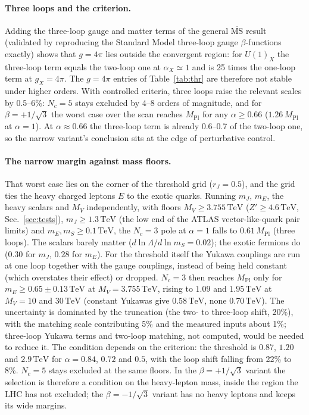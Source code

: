 \documentclass[11pt,a4paper]{article}
\newcommand{\Nc}{N_c}
\newcommand{\MPl}{M_{\mathrm{Pl}}}
\newcommand{\TeV}{\,\mathrm{TeV}}
\begin{document}
\paragraph{Three loops and the criterion.} Adding the three-loop gauge and matter terms of
the general $\overline{\text{MS}}$ result~\cite{Poole:2019kcm} (validated by reproducing
the Standard Model three-loop gauge $\beta$-functions~\cite{Mihaila:2012fm} exactly)
shows that $g=4\pi$ lies outside the convergent region: for $U(1)_X$ the three-loop term
equals the two-loop one at $\alpha_X\simeq1$ and is 25 times the one-loop term at
$g_X=4\pi$. The $g=4\pi$ entries of Table~\ref{tab:thr} are therefore not stable under
higher orders. With controlled criteria, three loops raise the relevant scales by
0.5--6\%: $\Nc=5$ stays excluded by 4--8 orders of magnitude, and for $\beta=+1/\sqrt3$
the worst case over the scan reaches $\MPl$ for any $\alpha\ge0.66$ ($1.26\,\MPl$ at
$\alpha=1$). At $\alpha\approx0.66$ the three-loop term is already 0.6--0.7 of the
two-loop one, so the narrow variant's conclusion sits at the edge of perturbative control.

\paragraph{The narrow margin against mass floors.} That worst case lies on the corner of
the threshold grid ($r_J=0.5$), and the grid ties the heavy charged leptons $E$ to the
exotic quarks. Running $m_J$, $m_E$, the heavy scalars and $M_V$ independently, with
floors $M_V\ge3.755\TeV$ ($Z'\ge4.6\TeV$, Sec.~\ref{sec:tests}), $m_J\ge1.3\TeV$ (the low
end of the ATLAS vector-like-quark pair limits) and $m_E,m_S\ge0.1\TeV$, the $\Nc=3$ pole at
$\alpha=1$ falls to $0.61\,\MPl$ (three loops). The scalars barely matter
($d\ln\Lambda/d\ln m_S=0.02$); the exotic fermions do ($0.30$ for $m_J$, $0.28$ for $m_E$).
For the threshold itself the Yukawa couplings are run at one loop together with the gauge
couplings, instead of being held constant (which overstates their effect) or dropped.
$\Nc=3$ then reaches $\MPl$ only for $m_E\ge0.65\pm0.13\TeV$ at $M_V=3.755\TeV$, rising to
$1.09$ and $1.95\TeV$ at $M_V=10$ and $30\TeV$ (constant Yukawas give $0.58\TeV$, none
$0.70\TeV$). The uncertainty is dominated by the truncation (the two- to three-loop shift,
20\%), with the matching scale contributing 5\% and the measured inputs about 1\%;
three-loop Yukawa terms and two-loop matching, not computed, would be needed to reduce it.
The condition depends on the criterion: the threshold is $0.87$, $1.20$ and $2.9\TeV$ for
$\alpha=0.84$, $0.72$ and $0.5$, with the loop shift falling from 22\% to 8\%. $\Nc=5$
stays excluded at the same floors. In the $\beta=+1/\sqrt3$ variant the selection is
therefore a condition on the heavy-lepton mass, inside the region the LHC has not
excluded; the $\beta=-1/\sqrt3$ variant has no heavy leptons and keeps its wide margins.
\end{document}
